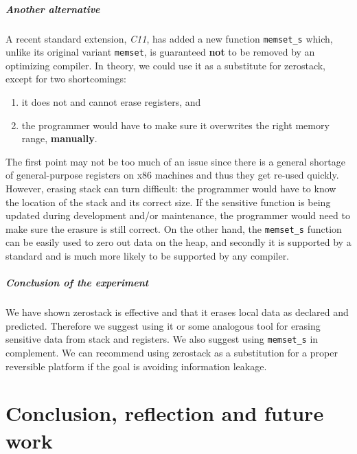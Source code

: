 \documentclass[a4paper,10pt,openright]{memoir}
\newcommand{\term}[1]{\textit{#1}}
\newcommand{\code}[1]{\texttt{#1}}
\begin{document}
\paragraph{Another alternative}

A recent standard extension, \term{C11}, has added a new function 
\code{memset\_s} which, unlike its original variant \code{memset}, is 
guaranteed \textbf{not} to be removed by an optimizing compiler. In 
theory, we could use it as a substitute for zerostack, except 
for two shortcomings:

\begin{enumerate}
\item it does not and cannot erase registers, and
\item the programmer would have to make sure it overwrites the right memory range, \textbf{manually}.
\end{enumerate}

The first point may not be too much of an issue since there is a 
general shortage of general-purpose registers on x86 machines and thus 
they get re-used quickly. However, erasing stack can turn difficult: 
the programmer would have to know the location of the stack and its 
correct size. If the sensitive function is being updated during 
development and/or maintenance, the programmer would need to make sure 
the erasure is still correct. On the other hand, the \code{memset\_s} 
function can be easily used to zero out data on the heap, and secondly 
it is supported by a standard and is much more likely to be supported 
by any compiler.

\paragraph{Conclusion of the experiment}

We have shown zerostack is effective and that it erases local 
data as declared and predicted. Therefore we suggest using it or some 
analogous tool for erasing sensitive data from stack and registers. We 
also suggest using \code{memset\_s} in complement. We can recommend 
using zerostack as a substitution for a proper reversible 
platform if the goal is avoiding information leakage.


\chapter{Conclusion, reflection and future work}

\end{document}
